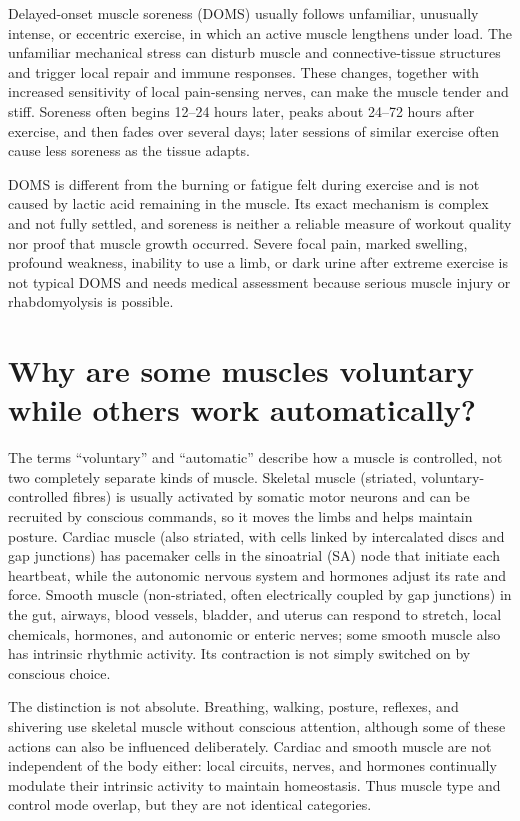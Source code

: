 \documentclass[11pt,oneside]{report}
\begin{document}
Delayed-onset muscle soreness (DOMS) usually follows unfamiliar, unusually
intense, or eccentric exercise, in which an active muscle lengthens under load.
The unfamiliar mechanical stress can disturb muscle and connective-tissue
structures and trigger local repair and immune responses. These changes,
together with increased sensitivity of local pain-sensing nerves, can make the
muscle tender and stiff. Soreness often begins 12--24 hours later, peaks about
24--72 hours after exercise, and then fades over several days; later sessions
of similar exercise often cause less soreness as the tissue adapts.

DOMS is different from the burning or fatigue felt during exercise and is not
caused by lactic acid remaining in the muscle. Its exact mechanism is complex
and not fully settled, and soreness is neither a reliable measure of workout
quality nor proof that muscle growth occurred. Severe focal pain, marked
swelling, profound weakness, inability to use a limb, or dark urine after
extreme exercise is not typical DOMS and needs medical assessment because
serious muscle injury or rhabdomyolysis is possible.

\section{Why are some muscles voluntary while others work automatically?}

The terms ``voluntary'' and ``automatic'' describe how a muscle is controlled,
not two completely separate kinds of muscle. Skeletal muscle (striated, voluntary-controlled fibres) is usually
activated by somatic motor neurons and can be recruited by conscious commands,
so it moves the limbs and helps maintain posture. Cardiac muscle (also striated,
with cells linked by intercalated discs and gap junctions) has pacemaker cells
in the sinoatrial (SA) node that initiate each heartbeat, while the autonomic
nervous system and hormones adjust its rate and force. Smooth muscle (non-striated,
often electrically coupled by gap junctions) in the gut, airways, blood vessels,
bladder, and uterus can respond to stretch, local chemicals, hormones, and
autonomic or enteric nerves; some smooth muscle also has intrinsic rhythmic
activity. Its contraction is not simply switched on by conscious choice.

The distinction is not absolute. Breathing, walking, posture, reflexes, and
shivering use skeletal muscle without conscious attention, although some of
these actions can also be influenced deliberately. Cardiac and smooth muscle
are not independent of the body either: local circuits, nerves, and hormones
continually modulate their intrinsic activity to maintain homeostasis. Thus
muscle type and control mode overlap, but they are not identical categories.
\end{document}
